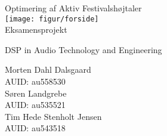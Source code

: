 


\fancyhead{}
\fancyfoot{}
\rfoot{\thepage}
\begin{center}
\begin{Huge}
\vspace*{0.5 cm}
Optimering af Aktiv Festivalshøjtaler \\
\vspace*{0.5cm}
\texttt{[image: figur/forside]}\\
Eksamensprojekt\\
\end{Huge}
\begin{Large}
DSP in Audio Technology and Engineering\\
\vspace*{1 cm}
\end{Large}
\end{center}
\begin{center}
\begin{large}
Morten Dahl Dalsgaard\\
\vspace*{.2cm}
AUID: au558530\\
\vspace*{.6cm}
Søren Landgrebe\\
\vspace*{.2cm}
AUID: au535521\\
\vspace*{.6cm}
Tim Hede Stenholt Jensen\\
\vspace*{.2cm}
AUID: au543518\\
\end{large}
\end{center}
\pagebreak


\tableofcontents

\pagebreak


\pagebreak


\pagebreak


\pagebreak


\pagebreak


\pagebreak



\pagebreak


\pagebreak





